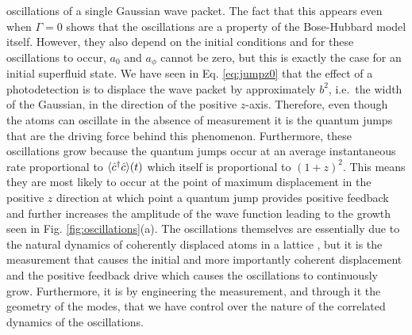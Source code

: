 oscillations of a single Gaussian wave packet. The fact that this
appears even when $\Gamma = 0$ shows that the oscillations are a
property of the Bose-Hubbard model itself. However, they also depend
on the initial conditions and for these oscillations to occur, $a_0$
and $a_\phi$ cannot be zero, but this is exactly the case for an
initial superfluid state. We have seen in Eq. \eqref{eq:jumpz0} that
the effect of a photodetection is to displace the wave packet by
approximately $b^2$, i.e.~the width of the Gaussian, in the direction
of the positive $z$-axis. Therefore, even though the atoms can
oscillate in the absence of measurement it is the quantum jumps that
are the driving force behind this phenomenon. Furthermore, these
oscillations grow because the quantum jumps occur at an average
instantaneous rate proportional to $\langle \hat{c}^\dagger \hat{c} \rangle (t)$ which
itself is proportional to $(1+z)^2$. This means they are most likely
to occur at the point of maximum displacement in the positive $z$
direction at which point a quantum jump provides positive feedback and
further increases the amplitude of the wave function leading to the
growth seen in Fig. \ref{fig:oscillations}(a). The oscillations
themselves are essentially due to the natural dynamics of coherently
displaced atoms in a lattice , but it is the measurement that causes
the initial and more importantly coherent displacement and the
positive feedback drive which causes the oscillations to continuously
grow. Furthermore, it is by engineering the measurement, and through
it the geometry of the modes, that we have control over the nature of
the correlated dynamics of the oscillations.

